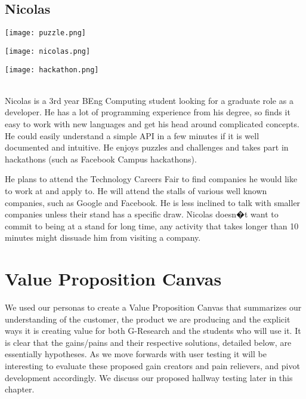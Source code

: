 \subsection{Nicolas}

\begin{minipage}{.333\textwidth}
  \centering
  \texttt{[image: puzzle.png]}
\end{minipage}%
\begin{minipage}{.333\textwidth}
  \centering
  \texttt{[image: nicolas.png]}
\end{minipage}
\begin{minipage}{.333\textwidth}
  \centering
  \texttt{[image: hackathon.png]}
\end{minipage}\\

Nicolas is a 3rd year BEng Computing student looking for a graduate role as a developer. He has a lot of programming experience from his degree, so finds it easy to work with new languages and get his head around complicated concepts. He could easily understand a simple API in a few minutes if it is well documented and intuitive. He enjoys puzzles and challenges and takes part in hackathons (such as Facebook Campus hackathons).

He plans to attend the Technology Careers Fair to find companies he would like to work at and apply to. He will attend the stalls of various well known companies, such as Google and Facebook. He is less inclined to talk with smaller companies unless their stand has a specific draw. Nicolas doesn�t want to commit to being at a stand for long time, any activity that takes longer than 10 minutes might dissuade him from visiting a company. 

\section{Value Proposition Canvas}
We used our personas to create a Value Proposition Canvas that summarizes our understanding of the customer, the product we are producing and the explicit ways it is creating value for both G-Research and the students who will use it. It is clear that the gains/pains and their respective solutions, detailed below, are essentially hypotheses. As we move forwards with user testing it will be interesting to evaluate these proposed gain creators and pain relievers, and pivot development accordingly. We discuss our proposed hallway testing later in this chapter. 

